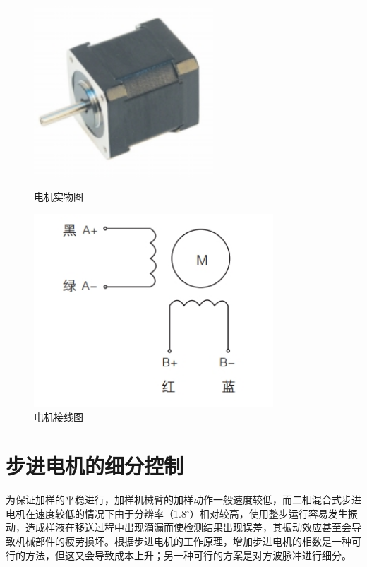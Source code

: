 \begin{figure}[htbp] 
	\begin{minipage}[b]{0.5\textwidth} 
		\centering 
		\includegraphics[width=0.6\textwidth]{chap/figure/4-8.jpg} 
		\caption{电机实物图} 
		\label{fig:4-8} 
	\end{minipage}%
	\begin{minipage}[b]{0.5\textwidth} 
		\centering
		\centering 
		\includegraphics[width=0.8\textwidth]{chap/figure/4-9.jpg}  
		\caption{电机接线图} 
		\label{fig:4-9} 
	\end{minipage} 
\end{figure}



\section{步进电机的细分控制}
为保证加样的平稳进行，加样机械臂的加样动作一般速度较低，而二相混合式步进电机在速度较低的情况下由于分辨率（1.8$^ \circ $）相对较高，使用整步运行容易发生振动，造成样液在移送过程中出现滴漏而使检测结果出现误差，其振动效应甚至会导致机械部件的疲劳损坏\supercite{bib10}。根据步进电机的工作原理，增加步进电机的相数是一种可行的方法，但这又会导致成本上升；另一种可行的方案是对方波脉冲进行细分。

